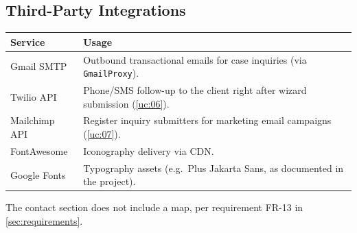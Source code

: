 \documentclass{article}
\begin{document}
\subsection{Third-Party Integrations}
\begin{tabularx}{\textwidth}{@{} l X @{}}
\toprule
\textbf{Service} & \textbf{Usage} \\
\midrule
Gmail SMTP & Outbound transactional emails for case inquiries (via \texttt{GmailProxy}). \\
Twilio API & Phone/SMS follow-up to the client right after wizard submission (\ref{uc:06}). \\
Mailchimp API & Register inquiry submitters for marketing email campaigns (\ref{uc:07}). \\
FontAwesome & Iconography delivery via CDN. \\
Google Fonts & Typography assets (e.g.\ Plus Jakarta Sans, as documented in the project). \\
\bottomrule
\end{tabularx}

The contact section does not include a map, per requirement FR-13 in \ref{sec:requirements}.
\end{document}
